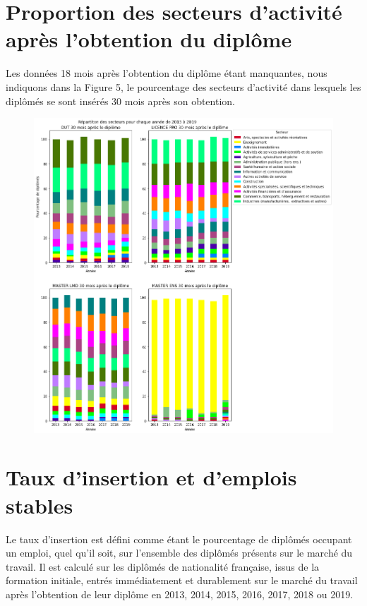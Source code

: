 \documentclass[12pt, a4paper, titlepage, table]{article}
\begin{document}
\section{Proportion des secteurs d'activité après l'obtention du diplôme}
	Les données 18 mois après l'obtention du diplôme étant manquantes, nous indiquons dans la Figure 5, le pourcentage des secteurs d'activité dans lesquels les diplômés se sont insérés 30 mois après son obtention. 

	\begin{figure}[H]
		\centering
		\includegraphics[width=1\textwidth]{../graphs/repartition_secteurs_situation.png}
	\end{figure}

\section{Taux d'insertion et d'emplois stables}

Le taux d’insertion est défini comme étant le pourcentage de diplômés occupant un emploi, quel qu’il soit, sur l’ensemble des diplômés présents sur le marché du travail. Il est calculé sur les diplômés de nationalité française, issus de la formation initiale, entrés immédiatement et durablement sur le marché du travail après l’obtention de leur diplôme en 2013, 2014, 2015, 2016, 2017, 2018 ou 2019.
\end{document}
